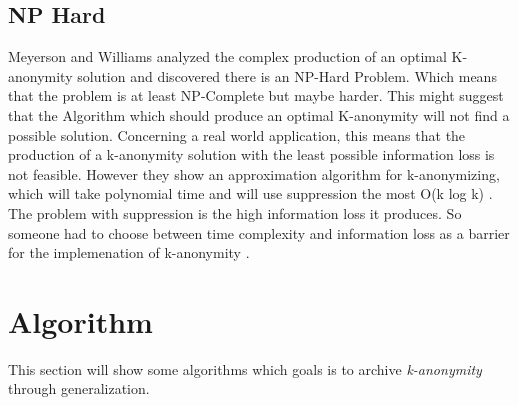 \documentclass{llncs}
\begin{document}
\subsection{NP Hard}
Meyerson and Williams analyzed the complex production of an optimal K-anonymity solution and discovered there is an NP-Hard Problem. Which means that the problem is at least NP-Complete but maybe harder. This might suggest that the Algorithm which should produce an optimal K-anonymity will not find a possible solution. Concerning a real world application, this means that the production of a k-anonymity solution with the least possible information loss is not feasible. However they show an approximation algorithm for k-anonymizing, which will take polynomial time and will use suppression the most O(k log k)  \cite{sweeney2002k}. The problem with suppression is the high information loss it produces. So someone had to choose between time complexity and information loss as a barrier for the implemenation of k-anonymity \cite{el2009globally}. 



\section{Algorithm}
This section will show some algorithms which goals is to archive \textit{k-anonymity} through generalization. 
\end{document}
